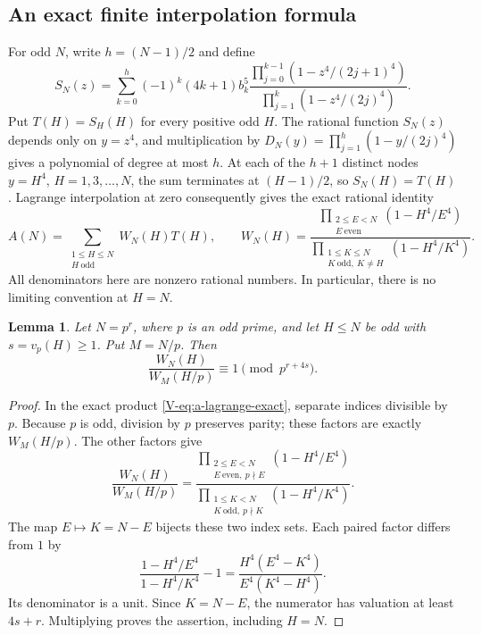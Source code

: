 \documentclass[11pt,letterpaper]{article}
\newtheorem{lemma}[theorem]{Lemma}
\numberwithin{equation}{section}
\begin{document}
\subsection{An exact finite interpolation formula}
For odd $N$, write $h=(N-1)/2$ and define
\[
 S_N(z)=\sum_{k=0}^h(-1)^k(4k+1)b_k^5
 \frac{\prod_{j=0}^{k-1}(1-z^4/(2j+1)^4)}
 {\prod_{j=1}^k(1-z^4/(2j)^4)}.
\]
Put $T(H)=S_H(H)$ for every positive odd $H$.  The rational function
$S_N(z)$ depends only on $y=z^4$, and multiplication by
$D_N(y)=\prod_{j=1}^h(1-y/(2j)^4)$ gives a polynomial of degree at most
$h$. At each of the $h+1$ distinct nodes $y=H^4$, $H=1,3,\ldots,N$,
the sum terminates at $(H-1)/2$, so $S_N(H)=T(H)$. Lagrange
interpolation at zero consequently gives the exact rational identity
\begin{equation}\label{V-eq:a-lagrange-exact}
 A(N)=\sum_{\substack{1\le H\le N\\H\ \mathrm{odd}}}W_N(H)T(H),
 \qquad
 W_N(H)=\frac{\prod_{\substack{2\le E<N\\E\ \mathrm{even}}}(1-H^4/E^4)}
 {\prod_{\substack{1\le K\le N\\K\ \mathrm{odd},\ K\ne H}}(1-H^4/K^4)}.
\end{equation}
All denominators here are nonzero rational numbers. In particular,
there is no limiting convention at $H=N$.

\begin{lemma}\label{V-lem:a-weight-scaling}
Let $N=p^r$, where $p$ is an odd prime, and let $H\le N$ be odd with
$s=v_p(H)\ge1$. Put $M=N/p$. Then
\[
 \frac{W_N(H)}{W_M(H/p)}\equiv1\pmod{p^{r+4s}}.
\]
\end{lemma}
\begin{proof}
In the exact product \eqref{V-eq:a-lagrange-exact}, separate indices
divisible by $p$. Because $p$ is odd, division by $p$ preserves parity;
these factors are exactly $W_M(H/p)$. The other factors give
\[
 \frac{W_N(H)}{W_M(H/p)}=
 \frac{\prod_{\substack{2\le E<N\\E\ \mathrm{even},\ p\nmid E}}(1-H^4/E^4)}
 {\prod_{\substack{1\le K<N\\K\ \mathrm{odd},\ p\nmid K}}(1-H^4/K^4)}.
\]
The map $E\mapsto K=N-E$ bijects these two index sets. Each paired
factor differs from $1$ by
\[
 \frac{1-H^4/E^4}{1-H^4/K^4}-1
 =\frac{H^4(E^4-K^4)}{E^4(K^4-H^4)}.
\]
Its denominator is a unit. Since $K=N-E$, the numerator has valuation
at least $4s+r$. Multiplying proves the assertion, including $H=N$.
\end{proof}
\end{document}
